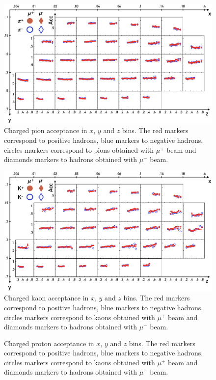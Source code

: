 \begin{figure}
	\includegraphics[scale=0.5]{./gfx/AccPi.png}
	\caption{Charged pion acceptance in $x$, $y$ and $z$ bins. The red markers correspond to positive hadrons, blue markers to negative hadrons, circles markers correspond to pions obtained with $\mu^+$ beam and diamonds markers to hadrons obtained with $\mu^-$ beam.}
	\label{pic:AccPi}
\end{figure}

\begin{figure}
	\includegraphics[scale=0.5]{./gfx/AccK.png}
	\caption{Charged kaon acceptance in $x$, $y$ and $z$ bins. The red markers correspond to positive hadrons, blue markers to negative hadrons, circles markers correspond to kaons obtained with $\mu^+$ beam and diamonds markers to hadrons obtained with $\mu^-$ beam.}
	\label{pic:AccK}
\end{figure}

\begin{figure}
	\caption{Charged proton acceptance in $x$, $y$ and $z$ bins. The red markers correspond to positive hadrons, blue markers to negative hadrons, circles markers correspond to kaons obtained with $\mu^+$ beam and diamonds markers to hadrons obtained with $\mu^-$ beam.}
	\label{pic:AccP}
\end{figure}

